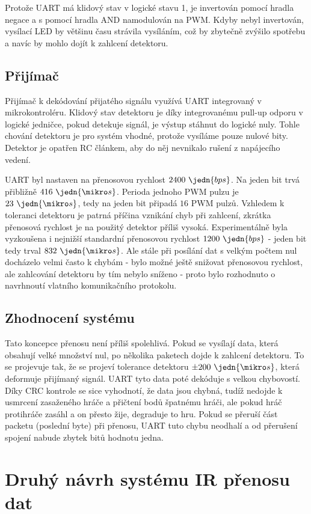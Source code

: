 Protože UART má klidový stav v logické stavu 1, je invertován pomocí hradla negace a s pomocí hradla AND namodulován na PWM. Kdyby nebyl invertován, vysílací LED by většinu času strávila vysíláním, což by zbytečně zvýšilo spotřebu a navíc by mohlo dojít k zahlcení detektoru.

\subsection{Přijímač}
Přijímač k dekódování přijatého signálu využívá UART integrovaný v mikrokontroléru. Klidový stav detektoru je díky integrovanému pull-up odporu v logické jedničce, pokud detekuje signál, je výstup stáhnut do logické nuly. Tohle chování detektoru je pro systém vhodné, protože vysíláme pouze nulové bity. Detektor je opatřen RC článkem, aby do něj nevnikalo rušení z napájecího vedení.

UART byl nastaven na přenosovou rychlost $2400~\jedn{bps}$. Na jeden bit trvá přibližně $416~\jedn{\mikro s}$. Perioda jednoho PWM pulzu je $23~\jedn{\mikro s}$, tedy na jeden bit připadá $16$ PWM pulzů. Vzhledem k toleranci detektoru je patrná příčina vznikání chyb při zahlcení, zkrátka přenosová rychlost je na použitý detektor příliš vysoká. Experimentálně byla vyzkoušena i nejnižší standardní přenosovou rychlost $1200~\jedn{bps}$ - jeden bit tedy trval $832~\jedn{\mikro s}$. Ale stále při posílání dat s velkým počtem nul docházelo velmi často k chybám - bylo možné ještě snižovat přenosovou rychlost, ale zahlcování detektoru by tím nebylo sníženo - proto bylo rozhodnuto o navrhnoutí vlatního komunikačního protokolu.

\subsection{Zhodnocení systému}
Tato koncepce přenosu není příliš spolehlivá. Pokud se vysílají data, která obsahují velké množství nul, po několika paketech dojde k zahlcení detektoru. To se projevuje tak, že se projeví tolerance detektoru $\pm200~\jedn{\mikro s}$, která deformuje přijímaný signál. UART tyto data poté dekóduje s velkou chybovostí. Díky CRC kontrole se sice vyhodnotí, že data jsou chybná, tudíž nedojde k usmrcení zasaženého hráče a přičtení bodů špatnému hráči, ale pokud hráč protihráče zasáhl a on přesto žije, degraduje to hru. Pokud se přeruší část packetu (poslední byte) při přenosu, UART tuto chybu neodhalí a od přerušení spojení nabude zbytek bitů hodnotu jedna.

\section{Druhý návrh systému IR přenosu dat}

